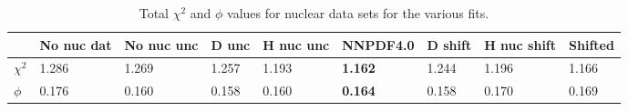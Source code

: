 \begin{table}[h]
  \centering
  \scriptsize
  \renewcommand{\arraystretch}{1}
  \begin{tabularx}{\textwidth}{l|ll|lll|lll}
    \toprule
  & No nuc dat & No nuc unc   & D unc & H nuc unc & {\bf NNPDF4.0 } & D shift  & H nuc shift & Shifted   \\
   \midrule
 {\bf $\chi^2$ } & 1.286 & 1.269 & 1.257 & 1.193 & {\bf 1.162 }  & 1.244  & 1.196 & 1.166  \\
 {\bf $\phi$ } & 0.176 & 0.160 & 0.158 & 0.160   & {\bf 0.164} & 0.158  &  0.170 & 0.169\\
    \bottomrule
  \end{tabularx}
  \caption{Total $\chi^2$ and $\phi$ values for nuclear data sets for the various fits. \label{tab:totchi2} }
  
\end{table}


